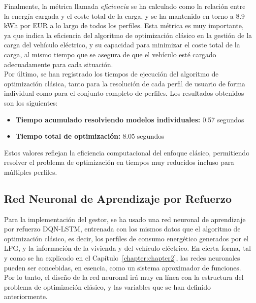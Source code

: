 Finalmente, la métrica llamada \textit{eficiencia} se ha calculado como la relación entre la energía
cargada y el coste total de la carga, y se ha mantenido en torno a 8.9 kWh por EUR a lo largo de 
todos los perfiles. Esta métrica es muy importante, ya que indica la eficiencia del algoritmo de 
optimización clásico en la gestión de la carga del vehículo eléctrico, y su capacidad para 
minimizar el coste total de la carga, al mismo tiempo que se asegura de que el vehículo esté
cargado adecuadamente para cada situación.\\

Por último, se han registrado los tiempos de ejecución del algoritmo de optimización clásica, tanto 
para la resolución de cada perfil de usuario de forma individual como para el conjunto completo de 
perfiles. Los resultados obtenidos son los siguientes:
\begin{itemize}
    \item \textbf{Tiempo acumulado resolviendo modelos individuales:} 0.57 segundos
    \item \textbf{Tiempo total de optimización:} 8.05 segundos
\end{itemize}

Estos valores reflejan la eficiencia computacional del enfoque clásico, permitiendo resolver el 
problema de optimización en tiempos muy reducidos incluso para múltiples perfiles.

\subsection{Red Neuronal de Aprendizaje por Refuerzo}
Para la implementación del gestor, se ha usado una red neuronal de aprendizaje por refuerzo DQN-LSTM, 
entrenada con los mismos datos que el algoritmo de optimización clásico, es decir, los perfiles de
consumo energético generados por el LPG, y la información de la vivienda y del vehículo eléctrico. 
En cierta forma, tal y como se ha explicado en el Capítulo~\ref{chapter:chapter2}, las redes 
neuronales pueden ser concebidas, en esencia, como un sistema aproximador de funciones. Por lo 
tanto, el diseño de la red neuronal irá muy en línea con la estructura del problema de optimización
clásico, y las variables que se han definido anteriormente.\\

